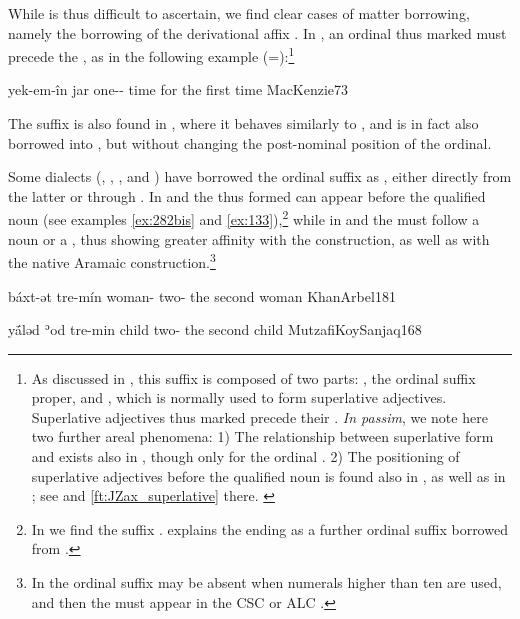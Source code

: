 While  is thus difficult to ascertain, we find clear cases of matter borrowing, namely the borrowing of the \Sor derivational affix . In \Sor, an ordinal thus marked must precede the , as in the following example (=):\footnote{As discussed in , this  suffix is composed of two parts: , the ordinal suffix proper, and ,  which is normally used to form superlative adjectives. Superlative adjectives thus marked precede their . \textit{In passim}, we note here two further areal phenomena: 1) The relationship between superlative form and  exists also in , though only for the ordinal . 2) The positioning of superlative adjectives before the qualified noun is found also in , as well as in ; see \JZax {} and \ref{ft:JZax_superlative} there. \label{ft:superlative_areal}} 


{yek-em-în jar}
{one-\ord-\supr{} time}
{for the first time}
{MacKenzie}{73}

The suffix  is also found in \Per, where it behaves similarly to \Sor \citep[262]{BalayEsmaili}, and is in fact also borrowed into \Kur \citep[25]{ThackstonKurmanji}, but without changing the post-nominal position of the ordinal.
  

Some  dialects (\JArb, \JKoy, \JSul, \JUrm and \JSan) have  borrowed the \Sor ordinal suffix as , either directly from the latter or through \Kur \citep[see also][166, \S 1.22.3]{Garbell1965impact}. In  \JUrm and \JSan the  thus formed can appear before the qualified noun (see examples \vref{ex:282bis} and \vref{ex:133}),\footnote{In \JUrm we find the suffix . \citet[166]{Garbell1965impact} explains the ending  as a further ordinal suffix borrowed from .}   while in \JArb and \JKoy the  must follow a \cst* noun or a \lnk*, thus showing greater affinity with the \Kur construction, as well as with the native Aramaic construction.\footnote{In \JUrm the ordinal suffix may be absent when numerals higher than ten are used, and then the  must appear in the CSC or ALC \citep[187]{KhanUrmi}.}

{báxt-ət tre-mín}
{woman-\cst{} two-\ord}
{the second woman}
{KhanArbel}{181}

{yā́ləd ʾod tre-min}
{child \lnk{} two-\ord}
{the second child}
{MutzafiKoySanjaq}{168}


